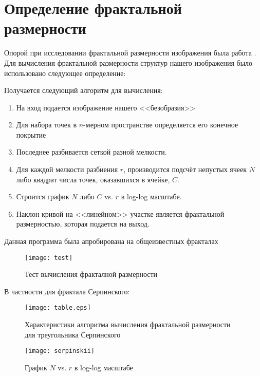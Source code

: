 \documentclass[12pt,twoside]{article}
\begin{document}
\section{Определение фрактальной размерности}	
Опорой при исследовании фрактальной размерности изображения была работа \cite{so2017enhancement}. Для вычисления фрактальной размерности структур нашего изображения было использовано следующее определение:


Получается следующий алгоритм для вычисления:
\begin{enumerate}
    \item На вход подается изображение нашего <<безобразия>>
    \item Для набора точек в $n$-мерном пространстве определяется его конечное покрытие
    \item Последнее разбивается сеткой разной мелкости. 
    \item Для каждой мелкости разбиения $r$, производится подсчёт непустых ячеек $N$ либо квадрат числа точек, оказавшихся в ячейке, $C$.
    \item Строится график $N$ либо $C$ vs. $r$ в log-log масштабе. 
    \item Наклон кривой на <<линейном>> участке является фрактальной размерностью,  которая подается на выход.
\end{enumerate}
Данная программа была апробирована на общеизвестных фракталах
\begin{figure}[H]
    \centering
    \texttt{[image: test]}
    \caption{Тест вычисления фракталной размерности}
\end{figure}
В частности для фрактала Серпинского:
\begin{figure}[H]
    \centering
    \texttt{[image: table.eps]}
    \caption{Характеристики алгоритма вычисления фрактальной размерности для треугольника Серпинского}
\end{figure}

\begin{figure}[H]
    \centering
    \texttt{[image: serpinskii]}
    \caption{График $N$ vs. $r$ в log-log масштабе}
\end{figure}
\end{document}
